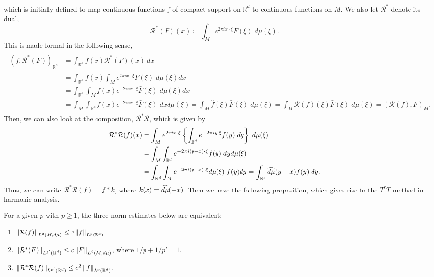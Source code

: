 \documentclass{article}
\begin{document}
which is initially defined to map continuous functions $f$ of compact support on $\mathbb{R}^{d}$ to continuous functions on $M$. We also let $\mathcal{R}^{\ast}$ denote its dual,
\begin{equation*}
	\mathcal{R}^{\ast}(F)(x) \coloneqq \int_{M}e^{2\pi i x \cdot \xi}F(\xi)\;d\mu(\xi).
\end{equation*} 
 This is made formal in the following sense, 
\begin{align*}
	\begin{split}
		(f,\mathcal{R}^{\ast}(F))_{\mathbb{R}^{d}} &= \int_{\mathbb{R}^{d}}f(x)\overline{\mathcal{R}^{\ast}(F)}(x)\;dx \\
		&= \int_{\mathbb{R}^{d}}f(x)\overline{\int_{M}e^{2\pi i x \cdot \xi}F(\xi)\;d\mu(\xi)}dx \\
		&= \int_{\mathbb{R}^{d}}\int_{M}f(x)e^{-2\pi i x  \cdot \xi}\bar{F}(\xi)\;d\mu(\xi)dx \\
		&= \int_{M}\int_{\mathbb{R}^{d}}f(x)e^{-2\pi i x \cdot \xi}\bar{F}(\xi)\;dxd\mu(\xi) = \int_{M}\hat{f}(\xi)\bar{F}(\xi)\;d\mu(\xi) = \int_{M}\mathcal{R}(f)(\xi)\bar{F}(\xi)\;d\mu(\xi) = (\mathcal{R}(f), F)_{M}. 
	\end{split} 
\end{align*}
Then, we can also look at the composition, $\mathcal{R}^{\ast}\mathcal{R}$, which is given by  
\begin{align*}
	\begin{split} 
	\mathcal{R}^{\ast}\mathcal{R}(f)(x) &= \int_{M}e^{2\pi i x \cdot \xi}\left\{\int_{\mathbb{R}^{d}}e^{-2\pi i y \cdot \xi}f(y)\;dy\right\}\;d\mu(\xi) \\
	&= \int_{M}\int_{\mathbb{R}^{d}}e^{-2\pi i (y - x)\cdot \xi}f(y)\;dyd\mu(\xi) \\
	&= \int_{\mathbb{R}^{d}}\int_{M}e^{-2\pi i (y - x) \cdot \xi}d\mu(\xi)\;f(y)dy = \int_{\mathbb{R}^{d}}\widehat{d\mu}(y - x)f(y)\;dy. 
	\end{split} 
\end{align*} 
Thus, we can write $\mathcal{R}^{\ast}\mathcal{R}(f) = f \ast k$, where $k(x) = \widehat{d\mu}(-x)$. Then we have the following proposition, which gives rise to the $T^{\ast}T$ method in harmonic analysis. 
\begin{prop}
	For a given $p$ with $p \geq 1$, the three norm estimates below are equivalent: \vspace{-0.25cm} 
	\begin{enumerate}[itemsep =-2pt,label = (\roman{*})]
		\item $\left\Vert \mathcal{R}(f) \right\Vert_{L^{2}(M, d\mu)} \leq c \left\Vert f \right\Vert_{L^{p}(\mathbb{R}^{d})}$. 
		\item $\left\Vert \mathcal{R}^{\ast}(F) \right\Vert_{L^{p'}(\mathbb{R}^{d})} \leq c \left\Vert F \right\Vert_{L^{2}(M, d\mu)}$, where $1/p + 1/p' = 1$. 
		\item $\left\Vert \mathcal{R}^{\ast}\mathcal{R}(f) \right\Vert_{L^{p'}(\mathbb{R}^{d})} \leq c^{2}\left\Vert f \right\Vert_{L^{p}(\mathbb{R}^{d})}$. 
	\end{enumerate}
\end{prop} 
\end{document}

